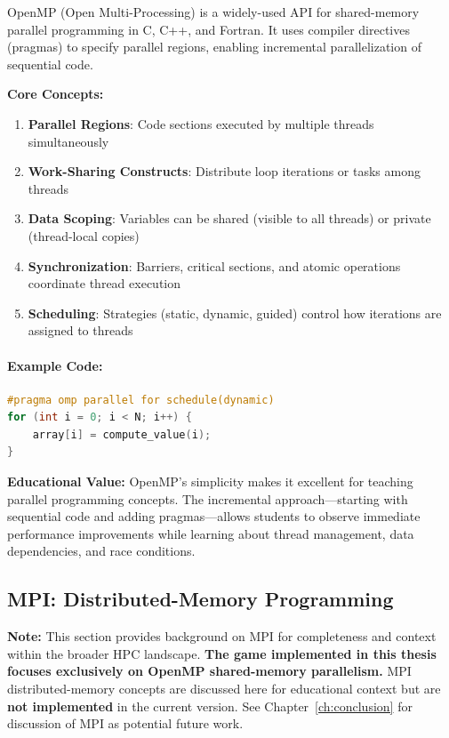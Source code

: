 OpenMP (Open Multi-Processing) is a widely-used API for shared-memory parallel programming in C, C++, and Fortran. It uses compiler directives (pragmas) to specify parallel regions, enabling incremental parallelization of sequential code.

\textbf{Core Concepts:}
\begin{enumerate}
    \item \textbf{Parallel Regions}: Code sections executed by multiple threads simultaneously
    \item \textbf{Work-Sharing Constructs}: Distribute loop iterations or tasks among threads
    \item \textbf{Data Scoping}: Variables can be shared (visible to all threads) or private (thread-local copies)
    \item \textbf{Synchronization}: Barriers, critical sections, and atomic operations coordinate thread execution
    \item \textbf{Scheduling}: Strategies (static, dynamic, guided) control how iterations are assigned to threads
\end{enumerate}

\paragraph*{Example Code:}

\begin{lstlisting}[language=C++, caption={Simple OpenMP parallel loop}]
#pragma omp parallel for schedule(dynamic)
for (int i = 0; i < N; i++) {
    array[i] = compute_value(i);
}
\end{lstlisting}

\textbf{Educational Value:} OpenMP's simplicity makes it excellent for teaching parallel programming concepts. The incremental approach—starting with sequential code and adding pragmas—allows students to observe immediate performance improvements while learning about thread management, data dependencies, and race conditions.

\subsection{MPI: Distributed-Memory Programming}
\label{subsec:mpi}

\begin{mdframed}[backgroundcolor=yellow!10, linecolor=orange, linewidth=2pt]
    \textbf{Note:} This section provides background on MPI for completeness and context within the broader HPC landscape. \textbf{The game implemented in this thesis focuses exclusively on OpenMP shared-memory parallelism.} MPI distributed-memory concepts are discussed here for educational context but are \textbf{not implemented} in the current version. See Chapter~\ref{ch:conclusion} for discussion of MPI as potential future work.
\end{mdframed}

